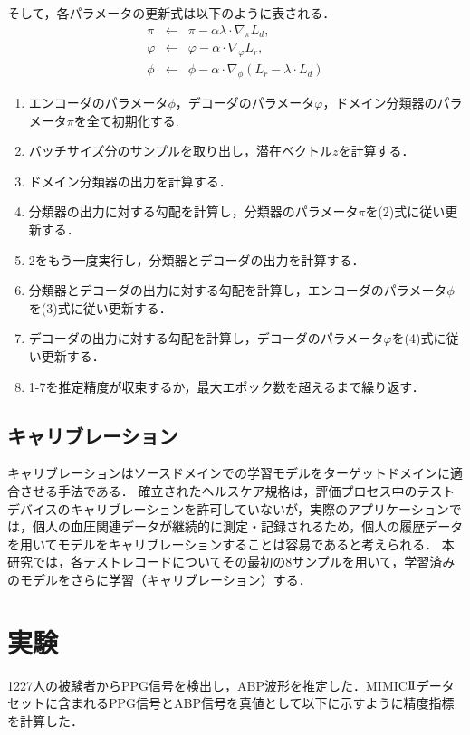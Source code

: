 \documentclass[twocolumn, a4paper]{ieicejsp}
\begin{document}
{そして，各パラメータの更新式は以下のように表される．
\vspace{-0.2cm}
\begin{eqnarray}
  \pi & \leftarrow & \pi - \alpha \lambda \cdot \nabla_{\pi} L_d, \\
  \varphi & \leftarrow & \varphi - \alpha \cdot \nabla_{\varphi} L_r, \\
  \phi & \leftarrow & \phi - \alpha \cdot \nabla_{\phi} (L_r - \lambda \cdot L_d)
\end{eqnarray}

\begin{enumerate}
\item エンコーダのパラメータ$\phi$，デコーダのパラメータ$\varphi$，ドメイン分類器のパラメータ$\pi$を全て初期化する.
\item バッチサイズ分のサンプルを取り出し，潜在ベクトル$z$を計算する．
\item ドメイン分類器の出力を計算する．
\item 分類器の出力に対する勾配を計算し，分類器のパラメータ$\pi$を(2)式に従い更新する．
\item 2をもう一度実行し，分類器とデコーダの出力を計算する．
\item 分類器とデコーダの出力に対する勾配を計算し，エンコーダのパラメータ$\phi$を(3)式に従い更新する．
\item デコーダの出力に対する勾配を計算し，デコーダのパラメータ$\varphi$を(4)式に従い更新する．
\item 1-7を推定精度が収束するか，最大エポック数を超えるまで繰り返す．

\end{enumerate}

\vspace{-0.4cm}
\subsection{キャリブレーション}
キャリブレーションはソースドメインでの学習モデルをターゲットドメインに適合させる手法である．
確立されたヘルスケア規格は，評価プロセス中のテストデバイスのキャリブレーションを許可していないが，実際のアプリケーションでは，個人の血圧関連データが継続的に測定・記録されるため，個人の履歴データを用いてモデルをキャリブレーションすることは容易であると考えられる．
本研究では，各テストレコードについてその最初の8サンプルを用いて，学習済みのモデルをさらに学習（キャリブレーション）する．

\vspace{-0.2cm}
\section{実験}
1227人の被験者からPPG信号を検出し，ABP波形を推定した．MIMIC$\mathrm{I}\hspace{-1.2pt}\mathrm{I}$データセット\cite{dataset}に含まれるPPG信号とABP信号を真値として以下に示すように精度指標を計算した．

}
\end{document}

